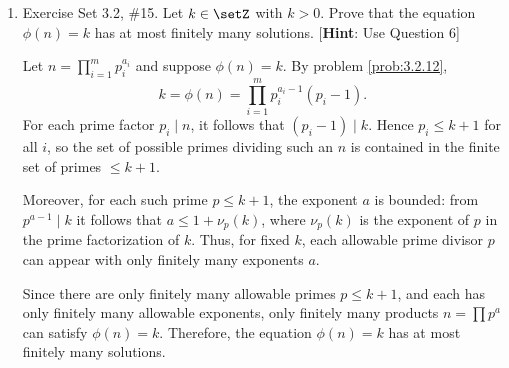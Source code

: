 \begin{enumerate}
  \item Exercise Set 3.2, \#15.
  Let $k \in \setZ$ with $k>0$. Prove that the equation $\phi(n)=k$ has 
  at most finitely many solutions. 
  [\textbf{Hint}: Use Question 6]
  \begin{subprove}
    Let $n=\prod_{i=1}^m p_i^{a_i}$ and suppose $\phi(n)=k$. By problem \ref{prob:3.2.12},
    \[
      k=\phi(n)=\prod_{i=1}^m p_i^{a_i-1}(p_i-1).
    \]
    For each prime factor $p_i\mid n$, it follows that $(p_i-1)\mid k$. Hence $p_i\le k+1$ for all $i$,
    so the set of possible primes dividing such an $n$ is contained in the finite set of primes $\le k+1$.

    Moreover, for each such prime $p\le k+1$, the exponent $a$ is bounded: from $p^{a-1}\mid k$ it follows that
    $a\le 1+\nu_p(k)$, where $\nu_p(k)$ is the exponent of $p$ in the prime factorization of $k$.
    Thus, for fixed $k$, each allowable prime divisor $p$ can appear with only finitely many exponents $a$.

    Since there are only finitely many allowable primes $p\le k+1$, and each has only finitely many allowable
    exponents, only finitely many products $n=\prod p^{a}$ can satisfy $\phi(n)=k$. Therefore, the equation
    $\phi(n)=k$ has at most finitely many solutions.
  \end{subprove}




\end{enumerate}
